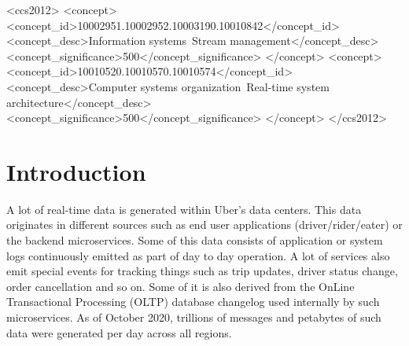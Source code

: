 \documentclass[sigconf]{acmart}
\begin{document}
\begin{CCSXML}
<ccs2012>
<concept>
<concept_id>10002951.10002952.10003190.10010842</concept_id>
<concept_desc>Information systems~Stream management</concept_desc>
<concept_significance>500</concept_significance>
</concept>
<concept>
<concept_id>10010520.10010570.10010574</concept_id>
<concept_desc>Computer systems organization~Real-time system architecture</concept_desc>
<concept_significance>500</concept_significance>
</concept>
</ccs2012>
\end{CCSXML}




\maketitle

\section{Introduction} \label{sec:intro}
A lot of real-time data is generated within Uber’s data centers. This data originates in different sources such as end user applications (driver/rider/eater) or the backend microservices. Some of this data consists of application or system logs continuously emitted as part of day to day operation. A lot of services also emit special events for tracking things such as trip updates, driver status change, order cancellation and so on. Some of it is also derived from the OnLine Transactional Processing (OLTP) database changelog used internally by such microservices. As of October 2020, trillions of messages and petabytes of such data were generated per day across all regions. 
\end{document}
